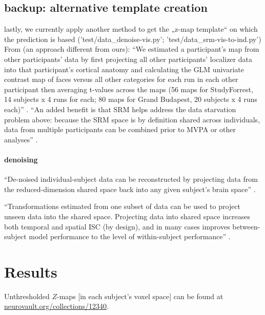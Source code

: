 \subsection{backup: alternative template creation}
%
lastly, we currently apply another method to get the „z-map template“ on which
the prediction is based ('test/data\_denoise-vis.py';
'test/data\_srm-vis-to-ind.py')
%
From \citep{jiahui2020predicting} (an approach different from ours): ``We
estimated a participant's map from other participants' data by first projecting
all other participants' localizer data into that participant's cortical anatomy
and calculating the GLM univariate contrast map of faces versus all other
categories for each run in each other participant then averaging t-values across
the maps (56 maps for StudyForrest, 14 subjects x 4 runs for each; 80 maps for
Grand Budapest, 20 subjects x 4 runs each)'' \citep{jiahui2020predicting}.
%
``An added benefit is that SRM helps address the data starvation problem above:
because the SRM space is by definition shared across individuals, data from
multiple participants can be combined prior to MVPA or other analyses''
\citep{cohen2017computational}.

\paragraph{denoising}
%
``De-noised individual-subject data can be reconstructed by
projecting data from the reduced-dimension shared space back into any given
subject’s brain space'' \citep{kumar2020brainiak}.

%
``Transformations estimated from one subset of data can be used to project
unseen data into the shared space. Projecting data into shared space increases
both temporal and spatial ISC (by design), and in many cases improves
between-subject model performance to the level of within-subject performance''
\citep{kumar2020brainiak}.


\section{Results}

Unthresholded $Z$-maps [in each subject's voxel space] can be found at
\href{https://identifiers.org/neurovault.collection:12340}{\url{neurovault.org/collections/12340}}.


